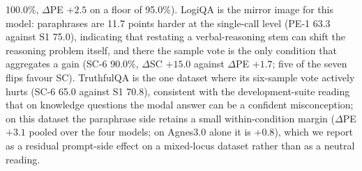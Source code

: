 100.0\%, $\Delta$PE $+2.5$ on a floor of 95.0\%). LogiQA is the mirror image for this model: paraphrases are 11.7 points harder at the single-call level (PE-1 63.3 against S1 75.0), indicating that restating a verbal-reasoning stem can shift the reasoning problem itself, and there the sample vote is the only condition that aggregates a gain (SC-6 90.0\%, $\Delta$SC $+15.0$ against $\Delta$PE $+1.7$; five of the seven flips favour SC). TruthfulQA is the one dataset where its six-sample vote actively hurts (SC-6 65.0 against S1 70.8), consistent with the development-suite reading that on knowledge questions the modal answer can be a confident misconception; on this dataset the paraphrase side retains a small within-condition margin ($\Delta$PE $+3.1$ pooled over the four models; on Agnes3.0 alone it is $+0.8$), which we report as a residual prompt-side effect on a mixed-locus dataset rather than as a neutral reading.

